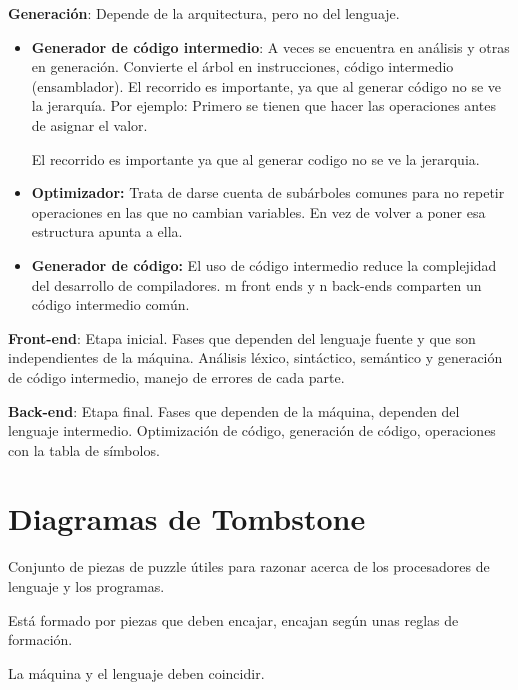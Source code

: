 \documentclass[12pt, twoside, openright]{report} %
\begin{document}
\textbf{Generación}: Depende de la arquitectura, pero no del lenguaje.
\begin{itemize}
  \item \textbf{Generador de código intermedio}: A veces se encuentra en análisis y otras
  en generación. Convierte el árbol en instrucciones, código
  intermedio (ensamblador). El recorrido es importante, ya que al generar
  código no se ve la jerarquía. Por ejemplo: Primero se tienen que hacer
  las operaciones antes de asignar el valor.
  
  El recorrido es importante ya que al generar codigo no se ve la jerarquia.
  
  \item \textbf{Optimizador:} Trata de darse cuenta de subárboles comunes para
  no repetir operaciones en las que no cambian variables. En vez de volver
  a poner esa estructura apunta a ella.
  
  \item \textbf{Generador de código:} El uso de código intermedio reduce la
  complejidad del desarrollo de compiladores. m front ends y n back-ends
  comparten un código intermedio común.

\end{itemize}

\textbf{Front-end}: Etapa inicial. Fases que dependen del lenguaje
fuente y que son independientes de la máquina. Análisis léxico,
sintáctico, semántico y generación de código intermedio, manejo de
errores de cada parte.

\textbf{Back-end}: Etapa final. Fases que dependen de la máquina,
dependen del lenguaje intermedio. Optimización de código, generación de
código, operaciones con la tabla de símbolos.

\pagebreak
\section{Diagramas de Tombstone}

Conjunto de piezas de puzzle útiles para razonar acerca de los
procesadores de lenguaje y los programas.

Está formado por piezas que deben encajar, encajan según unas reglas de
formación.

La máquina y el lenguaje deben coincidir.

\begin{figure}[H]
  {\def\svgwidth{.8\textwidth}
  }
\end{figure}
\end{document}
